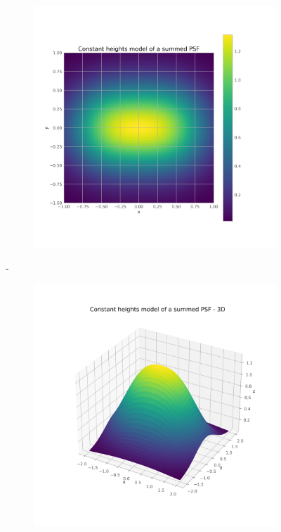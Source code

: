         \begin{figure}[H]
        \centering
        \begin{subfigure}{.45\textwidth}
            \includegraphics[width=\textwidth]{report/Figures/models/model_psf_const.png}
        \end{subfigure}%
        \hspace{1em}-
        \begin{subfigure}{.45\textwidth}
            \centering
            \includegraphics[width=\textwidth]{report/Figures/models/model_psf_const_3d.png}
        \end{subfigure}
        \caption{}
        \label{model_psf_const}
        \end{figure}

